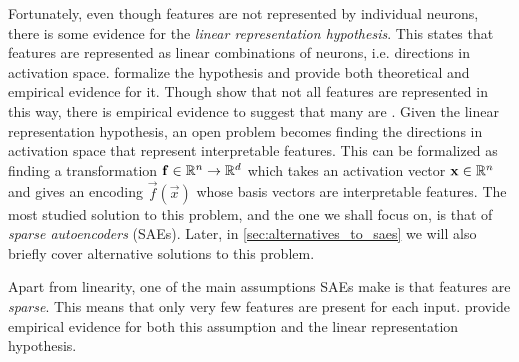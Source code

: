 Fortunately, even though features are not represented by individual neurons, there is some evidence for the \emph{linear representation hypothesis}.
This states that features are represented as linear combinations of neurons, i.e. directions in activation space.
\textcite{park_linear_2023} formalize the hypothesis and provide both theoretical and empirical evidence for it.
Though \textcite{engels_not_2024} show that not all features are represented in this way, there is empirical evidence to suggest that many are \parencite{neel_nanda_actually_2023}.
Given the linear representation hypothesis, an open problem becomes finding the directions in activation space that represent interpretable features.
This can be formalized as finding a transformation $\mathbf{f}\in\mathbb{R}^n\to\mathbb{R}^d$ which takes an activation vector $\mathbf{x}\in\mathbb{R}^n$ and gives an encoding $\vec f(\vec x)$ whose basis vectors are interpretable features.
The most studied solution to this problem, and the one we shall focus on, is that of \emph{sparse autoencoders} (SAEs).
Later, in \ref{sec:alternatives_to_saes} we will also briefly cover alternative solutions to this problem.

Apart from linearity, one of the main assumptions SAEs make is that features are \emph{sparse}.
This means that only very few features are present for each input.
\textcite{deng_measuring_2023} provide empirical evidence for both this assumption and the linear representation hypothesis.


